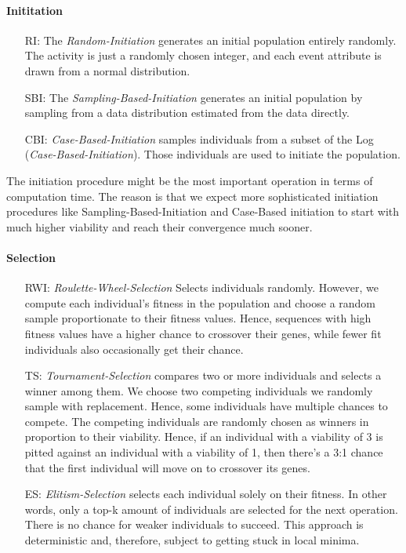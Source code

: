 \documentclass[./../../paper.tex]{subfiles}
\begin{document}
\paragraph{Inititation}
\begin{enumerate}
    \item[RI:] The \emph{Random-Initiation} generates an initial population entirely randomly. The activity is just a randomly chosen integer, and each event attribute is drawn from a normal distribution.
    \item[SBI:] The \emph{Sampling-Based-Initiation} generates an initial population by sampling from a data distribution estimated from the data directly.
    \item[CBI:] \emph{Case-Based-Initiation} samples individuals from a subset of the Log (\emph{Case-Based-Initiation}). Those individuals are used to initiate the population.
\end{enumerate}
The initiation procedure might be the most important operation in terms of computation time. The reason is that we expect more sophisticated initiation procedures like Sampling-Based-Initiation and Case-Based initiation to start with much higher viability and reach their convergence much sooner.


\paragraph{Selection}
\begin{enumerate}
    \item[RWI:] \emph{Roulette-Wheel-Selection} Selects individuals randomly. However, we compute each individual's fitness in the population and choose a random sample proportionate to their fitness values. Hence, sequences with high fitness values have a higher chance to crossover their genes, while fewer fit individuals also occasionally get their chance.
    \item[TS:] \emph{Tournament-Selection} compares two or more individuals and selects a winner among them. We choose two competing individuals we randomly sample with replacement. Hence, some individuals have multiple chances to compete. The competing individuals are randomly chosen as winners in proportion to their viability. Hence, if an individual with a viability of 3 is pitted against an individual with a viability of 1, then there's a 3:1 chance that the first individual will move on to crossover its genes.
    \item[ES:] \emph{Elitism-Selection} selects each individual solely on their fitness. In other words, only a top-k amount of individuals are selected for the next operation. There is no chance for weaker individuals to succeed. This approach is deterministic and, therefore, subject to getting stuck in local minima.
\end{enumerate}
\end{document}
